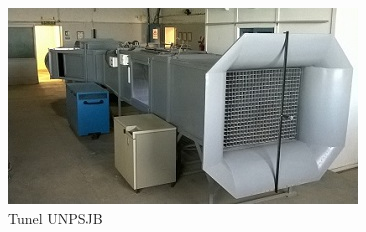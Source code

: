 	\begin{figure}[htb]
		\centering
		\includegraphics[scale=0.35]{tunel_unpsjb.JPG}
		\caption{Tunel UNPSJB}
		\label{fig:tunelUni}
		\end{figure}